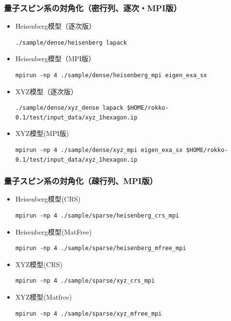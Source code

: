 \begin{frame}[c,fragile]
  \frametitle{量子スピン系の対角化（密行列、逐次・MPI版）}
  \begin{itemize}
  \item Heisenberg模型（逐次版） 
\begin{lstlisting}[style=shstyle]
./sample/dense/heisenberg lapack
\end{lstlisting}
  \item Heisenberg模型（MPI版） 
\begin{lstlisting}[style=shstyle]
mpirun -np 4 ./sample/dense/heisenberg_mpi eigen_exa_sx
\end{lstlisting}
  \item XYZ模型（逐次版） 
\begin{lstlisting}[style=shstyle]
./sample/dense/xyz_dense lapack $HOME/rokko-0.1/test/input_data/xyz_1hexagon.ip
\end{lstlisting}
  \item XYZ模型(MPI版) 
\begin{lstlisting}[style=shstyle]
mpirun -np 4 ./sample/dense/xyz_mpi eigen_exa_sx $HOME/rokko-0.1/test/input_data/xyz_1hexagon.ip
\end{lstlisting}
  \end{itemize}
\end{frame}

\begin{frame}[c,fragile]
  \frametitle{量子スピン系の対角化（疎行列、MPI版）}
  \begin{itemize}
  \item Heisenberg模型(CRS) 
\begin{lstlisting}[style=shstyle]
mpirun -np 4 ./sample/sparse/heisenberg_crs_mpi
\end{lstlisting}
  \item Heisenberg模型(MatFree) 
\begin{lstlisting}[style=shstyle]
mpirun -np 4 ./sample/sparse/heisenberg_mfree_mpi
\end{lstlisting}
  \item XYZ模型(CRS) 
\begin{lstlisting}[style=shstyle]
mpirun -np 4 ./sample/sparse/xyz_crs_mpi
\end{lstlisting}
  \item XYZ模型(Matfree) 
\begin{lstlisting}[style=shstyle]
mpirun -np 4 ./sample/sparse/xyz_mfree_mpi
\end{lstlisting}
  \end{itemize}
\end{frame}

